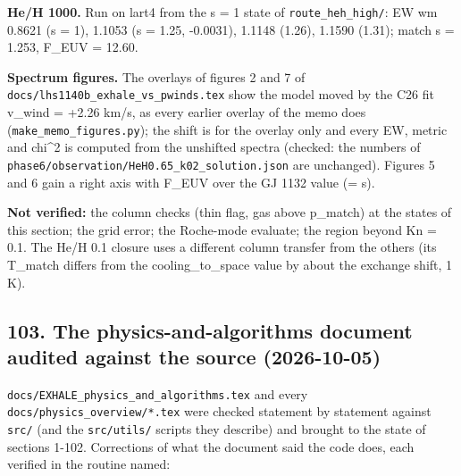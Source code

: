 \documentclass[english,a4paper]{my_memo}
\begin{document}
\textbf{He/H 1000.} Run on lart4 from the s = 1 state of \texttt{route\_heh\_high/}: EW wm
0.8621 (s = 1), 1.1053 (s = 1.25, -0.0031), 1.1148 (1.26), 1.1590 (1.31);
match s = 1.253, F\_EUV = 12.60.

\textbf{Spectrum figures.} The overlays of figures 2 and 7 of
\texttt{docs/lhs1140b\_exhale\_vs\_pwinds.tex} show the model moved by the C26 fit
v\_wind = +2.26 km/s, as every earlier overlay of the memo does
(\texttt{make\_memo\_figures.py}); the shift is for the overlay only and every EW,
metric and chi\^{}2 is computed from the unshifted spectra (checked: the numbers
of \texttt{phase6/observation/HeH0.65\_k02\_solution.json} are unchanged). Figures 5
and 6 gain a right axis with F\_EUV over the GJ 1132 value (= s).

\textbf{Not verified:} the column checks (thin flag, gas above p\_match) at the
states of this section; the grid error; the Roche-mode evaluate; the region
beyond Kn = 0.1. The He/H 0.1 closure uses a different column transfer from
the others (its T\_match differs from the cooling\_to\_space value by about
the exchange shift, 1 K).

\subsection{103. The physics-and-algorithms document audited against the source (2026-10-05)}\label{103-the-physics-and-algorithms-document-audited-against-the-source-2026-10-05}

\texttt{docs/EXHALE\_physics\_and\_algorithms.tex} and every \texttt{docs/physics\_overview/*.tex}
were checked statement by statement against \texttt{src/} (and the \texttt{src/utils/}
scripts they describe) and brought to the state of sections 1-102. Corrections
of what the document said the code does, each verified in the routine named:
\end{document}
